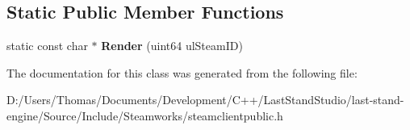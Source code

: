 \subsection*{Static Public Member Functions}
\begin{DoxyCompactItemize}
\item 
\hypertarget{classCSteamID_a8298a87b2205ac5b3866052fa378542c}{}static const char $\ast$ {\bfseries Render} (uint64 ul\+Steam\+I\+D)\label{classCSteamID_a8298a87b2205ac5b3866052fa378542c}

\end{DoxyCompactItemize}


The documentation for this class was generated from the following file\+:\begin{DoxyCompactItemize}
\item 
D\+:/\+Users/\+Thomas/\+Documents/\+Development/\+C++/\+Last\+Stand\+Studio/last-\/stand-\/engine/\+Source/\+Include/\+Steamworks/steamclientpublic.\+h\end{DoxyCompactItemize}
